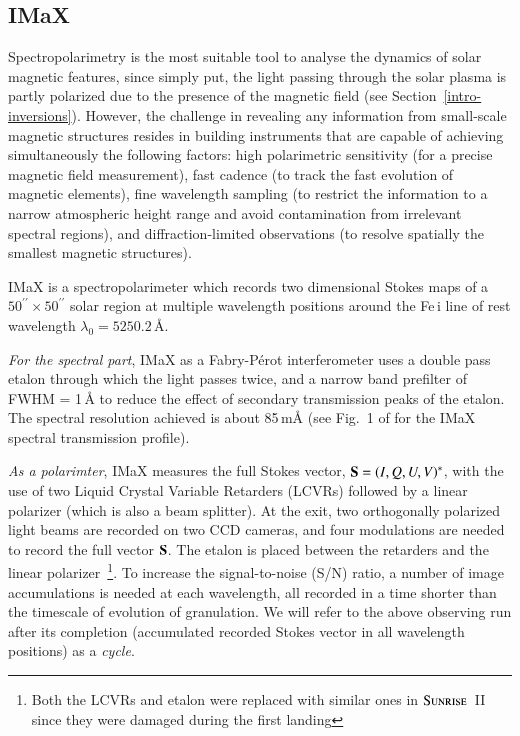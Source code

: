 \documentclass[goettingen, gauss, print]{thesis}
\begin{document}
\subsection{IMaX}
\label{intro-imax}

Spectropolarimetry is the most suitable tool to analyse the dynamics of solar magnetic features, since simply put, the light passing through the solar plasma is partly polarized due to the presence of the magnetic field (see Section~\ref{intro-inversions}). However, the challenge in revealing any information from small-scale magnetic structures resides in building instruments that are capable of achieving simultaneously the following factors: high polarimetric sensitivity (for a precise magnetic field measurement), fast cadence (to track the fast evolution of magnetic elements), fine wavelength sampling (to restrict the information to a narrow atmospheric height range and avoid contamination from irrelevant spectral regions), and diffraction-limited observations (to resolve spatially the smallest magnetic structures).

IMaX is a spectropolarimeter which records two dimensional Stokes maps of a $50^{\prime\prime}\times50^{\prime\prime}$ solar region at multiple wavelength positions around the Fe\,{\sc i} line of rest wavelength $\lambda_0 =5250.2$\,\AA{}. 

\textit{For the spectral part}, IMaX as a Fabry-P\'{e}rot interferometer uses a double pass etalon through which the light passes twice, and a narrow band prefilter of FWHM = 1\,\AA{} to reduce the effect of secondary transmission peaks of the etalon. The spectral resolution achieved is about 85\,m\AA{} (see Fig.~1 of \cite{riethmuller_comparison_2014} for the IMaX spectral transmission profile).

\textit{As a polarimter}, IMaX measures the full Stokes vector, ${\bf{S}} = (I,Q,U,V)^{*}$, with the use of two Liquid Crystal Variable Retarders (LCVRs) followed by a linear polarizer (which is also a beam splitter). At the exit, two orthogonally polarized light beams are recorded on two CCD cameras, and four modulations are needed to record the full vector $\bf{S}$. The etalon is placed between the retarders and the linear polarizer~\footnote{Both the LCVRs and etalon were replaced with similar ones in $\textsc{Sunrise}$~II since they were damaged during the first landing}. To increase the signal-to-noise (S/N) ratio, a number of image accumulations is needed at each wavelength, all recorded in a time shorter than the timescale of evolution of granulation. We will refer to the above observing run after its completion (accumulated recorded Stokes vector in all wavelength positions) as a \textit{cycle}.
\end{document}
